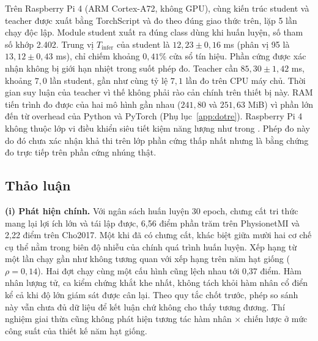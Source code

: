 Trên Raspberry Pi 4 (ARM Cortex-A72, không GPU), cùng kiến trúc student và
teacher được xuất bằng TorchScript và đo theo đúng giao thức trên, lặp 5 lần
chạy độc lập. Module student xuất ra đúng class dùng khi huấn luyện, số
tham số khớp 2.402. Trung vị $T_{\mathrm{infer}}$ của student là
$12{,}23 \pm 0{,}16$ ms (phân vị 95 là $13{,}12 \pm 0{,}43$ ms), chỉ chiếm
khoảng $0{,}41\%$ cửa sổ tín hiệu. Phần cứng được xác nhận không bị giới hạn
nhiệt trong suốt phép đo. Teacher cần $85{,}30 \pm 1{,}42$ ms, khoảng
$7{,}0$ lần student, gần như cùng tỷ lệ $7{,}1$ lần đo trên CPU máy chủ.
Thời gian suy luận của teacher vì thế không phải rào cản chính trên thiết
bị này. RAM tiến trình đo được của hai mô hình gần nhau ($241{,}80$ và
$251{,}63$ MiB) vì phần lớn đến từ overhead của Python và PyTorch
(Phụ lục~\ref{app:dotre}). Raspberry Pi 4 không thuộc lớp vi điều khiển
siêu tiết kiệm năng lượng như trong \cite{wang2024mibminet}. Phép đo này
do đó chưa xác nhận khả thi trên lớp phần cứng thấp nhất nhưng là bằng
chứng đo trực tiếp trên phần cứng nhúng thật.

\subsection{Thảo luận}
\label{sec:thaoluan}

\textbf{(i) Phát hiện chính.} Với ngân sách huấn luyện 30 epoch, chưng cất
tri thức mang lại lợi ích lớn và tái lập được, 6,56 điểm phần trăm trên PhysionetMI và 2,22 điểm trên
Cho2017. Một khi đã có chưng cất, khác biệt giữa mười hai cơ chế cụ thể nằm
trong biên độ nhiễu của chính quá trình huấn luyện. Xếp hạng từ một lần
chạy gần như không tương quan với xếp hạng trên năm hạt giống
($\rho = 0{,}14$). Hai đợt chạy cùng một cấu hình cũng lệch nhau tới 0,37
điểm. Hàm nhân lượng tử, ca kiểm chứng khắt khe nhất, không tách khỏi hàm nhân cổ
điển kể cả khi độ lớn giám sát được cân lại. Theo quy tắc chốt trước, phép so
sánh này vẫn chưa đủ dữ liệu để kết luận chứ không cho thấy tương đương. Thí
nghiệm giai thừa cũng không phát hiện tương tác hàm nhân $\times$ chiến lược
ở mức công suất của thiết kế năm hạt giống.


